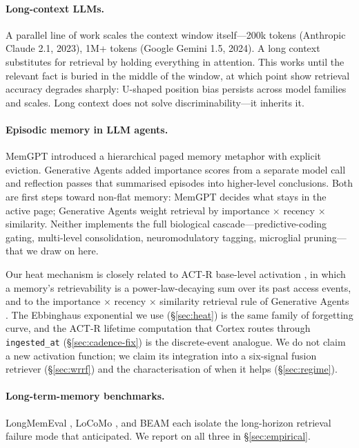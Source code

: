 \documentclass[11pt]{article}
\begin{document}
\paragraph{Long-context LLMs.}
A parallel line of work scales the context window
itself---200k tokens (Anthropic Claude 2.1, 2023), 1M+ tokens
(Google Gemini 1.5, 2024).  A long context substitutes for retrieval
by holding everything in attention.  This works until the relevant
fact is buried in the middle of the window, at which point
\citet{Liu2023} show retrieval accuracy degrades sharply: U-shaped
position bias persists across model families and scales.  Long
context does not solve discriminability---it inherits it.

\paragraph{Episodic memory in LLM agents.}
MemGPT \citep{Packer2024} introduced a hierarchical paged memory
metaphor with explicit eviction.  Generative Agents \citep{Park2023}
added importance scores from a separate model call and reflection
passes that summarised episodes into higher-level conclusions.  Both
are first steps toward non-flat memory: MemGPT decides what stays
in the active page; Generative Agents weight retrieval by importance
$\times$ recency $\times$ similarity.  Neither implements the full
biological cascade---predictive-coding gating, multi-level
consolidation, neuromodulatory tagging, microglial pruning---that
we draw on here.

Our heat mechanism is closely related to ACT-R base-level activation
\citep{Anderson1991}, in which a memory's retrievability is a
power-law-decaying sum over its past access events, and to the
importance $\times$ recency $\times$ similarity retrieval rule of
Generative Agents \citep{Park2023}.  The Ebbinghaus exponential we
use (\S\ref{sec:heat}) is the same family of forgetting curve, and
the ACT-R lifetime computation that Cortex routes through
\texttt{ingested\_at} (\S\ref{sec:cadence-fix}) is the discrete-event
analogue.  We do not claim a new activation function; we claim its
integration into a six-signal fusion retriever (\S\ref{sec:wrrf}) and
the characterisation of when it helps (\S\ref{sec:regime}).

\paragraph{Long-term-memory benchmarks.}
LongMemEval \citep{Wu2025}, LoCoMo \citep{Maharana2024}, and BEAM
\citep{Tavakoli2026} each isolate the long-horizon retrieval failure
mode that \citet{Liu2023} anticipated.  We report on all three in
\S\ref{sec:empirical}.
\end{document}
